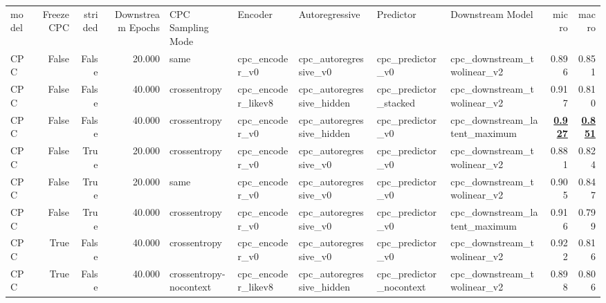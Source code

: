 \begin{adjustbox}{width=\textwidth}
\begin{tabular}{lrrrlllllrr}
{model} & {Freeze CPC} & {strided} & {Downstream Epochs} & {CPC Sampling Mode} & {Encoder} & {Autoregressive} & {Predictor} & {Downstream Model} & {micro} & {macro} \\
CPC & False & False & 20.000 & same & cpc\_encoder\_v0 & cpc\_autoregressive\_v0 & cpc\_predictor\_v0 & cpc\_downstream\_twolinear\_v2 & 0.896 & 0.851 \\
CPC & False & False & 40.000 & crossentropy & cpc\_encoder\_likev8 & cpc\_autoregressive\_hidden & cpc\_predictor\_stacked & cpc\_downstream\_twolinear\_v2 & 0.917 & 0.810 \\
CPC & False & False & 40.000 & crossentropy & cpc\_encoder\_v0 & cpc\_autoregressive\_hidden & cpc\_predictor\_v0 & cpc\_downstream\_latent\_maximum & \bfseries \underline{0.927} & \bfseries \underline{0.851} \\
CPC & False & True & 20.000 & crossentropy & cpc\_encoder\_v0 & cpc\_autoregressive\_v0 & cpc\_predictor\_v0 & cpc\_downstream\_twolinear\_v2 & 0.881 & 0.824 \\
CPC & False & True & 20.000 & same & cpc\_encoder\_v0 & cpc\_autoregressive\_v0 & cpc\_predictor\_v0 & cpc\_downstream\_twolinear\_v2 & 0.905 & 0.847 \\
CPC & False & True & 40.000 & crossentropy & cpc\_encoder\_v0 & cpc\_autoregressive\_v0 & cpc\_predictor\_v0 & cpc\_downstream\_latent\_maximum & 0.916 & 0.799 \\
CPC & True & False & 40.000 & crossentropy & cpc\_encoder\_v0 & cpc\_autoregressive\_v0 & cpc\_predictor\_v0 & cpc\_downstream\_twolinear\_v2 & 0.922 & 0.816 \\
CPC & True & False & 40.000 & crossentropy-nocontext & cpc\_encoder\_likev8 & cpc\_autoregressive\_hidden & cpc\_predictor\_nocontext & cpc\_downstream\_twolinear\_v2 & 0.898 & 0.806 \\
\end{tabular}
\end{adjustbox}